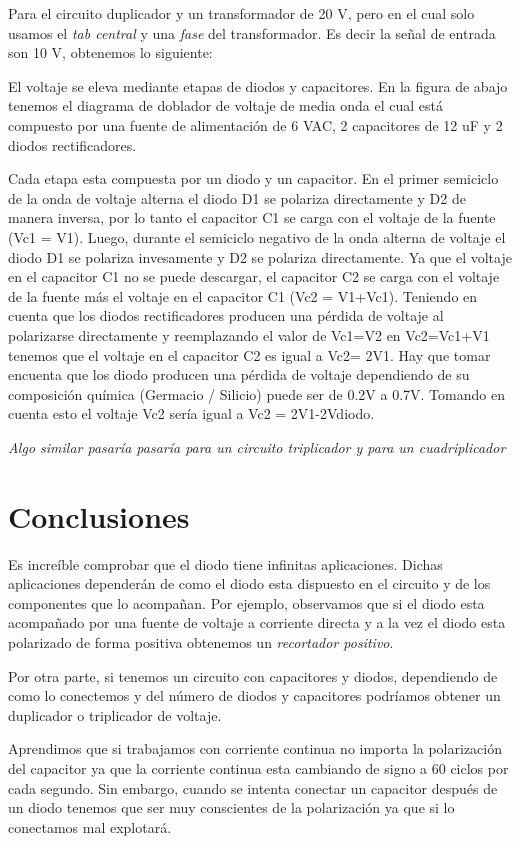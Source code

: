 \documentclass{mylib/reporteConCalif}
\begin{document}
Para el circuito duplicador y un transformador de 20 V, pero en el cual solo usamos el \textit{tab central} y una \textit{fase} del transformador. 
Es decir la señal de entrada son 10 V, obtenemos lo siguiente:


El voltaje se eleva mediante etapas de diodos y capacitores. En la figura de abajo tenemos el diagrama de doblador de voltaje de media onda el cual está compuesto por una fuente de alimentación de 6 VAC, 2 capacitores de 12 uF y 2 diodos rectificadores.


Cada etapa esta compuesta por un diodo y un capacitor. En el primer semiciclo de la onda de voltaje alterna el diodo D1 se polariza directamente y D2 de manera inversa, por lo tanto el capacitor C1 se carga con el voltaje de la fuente (Vc1 = V1).
Luego, durante el semiciclo negativo de la onda alterna de voltaje el diodo D1 se polariza invesamente y D2 se polariza directamente. Ya que el voltaje en el capacitor C1 no se puede descargar, el capacitor C2 se carga con el voltaje de la fuente más el voltaje en el capacitor C1 (Vc2 = V1+Vc1). Teniendo en cuenta que los diodos rectificadores producen una pérdida de voltaje al polarizarse directamente y reemplazando el valor de Vc1=V2 en Vc2=Vc1+V1 tenemos que el voltaje en el capacitor C2 es igual a Vc2= 2V1. Hay que tomar encuenta que los diodo producen una pérdida de voltaje dependiendo de su composición química (Germacio / Silicio) puede ser de 0.2V a 0.7V. Tomando en cuenta esto el voltaje Vc2 sería igual a Vc2 = 2V1-2Vdiodo.

\textit{Algo similar pasaría pasaría para un circuito triplicador y para un cuadriplicador}

\section{Conclusiones}

Es increíble comprobar que el diodo tiene infinitas aplicaciones. Dichas 
aplicaciones dependerán de como el diodo esta dispuesto en el circuito y de los componentes que lo acompañan.
Por ejemplo, observamos que si el diodo esta acompañado por una fuente de voltaje a corriente directa y a la vez el diodo esta polarizado de forma positiva obtenemos un \textit{recortador positivo}.

Por otra parte, si tenemos un circuito con capacitores y diodos, dependiendo de como lo conectemos y del número de diodos y capacitores podríamos obtener un duplicador o triplicador de voltaje.

Aprendimos que si trabajamos con corriente continua no importa la polarización del capacitor ya que la corriente continua esta cambiando de signo a 60 ciclos por cada segundo. Sin embargo, cuando se intenta conectar un capacitor después de un diodo tenemos que ser muy conscientes de la polarización ya que si lo conectamos mal explotará.
\end{document}
